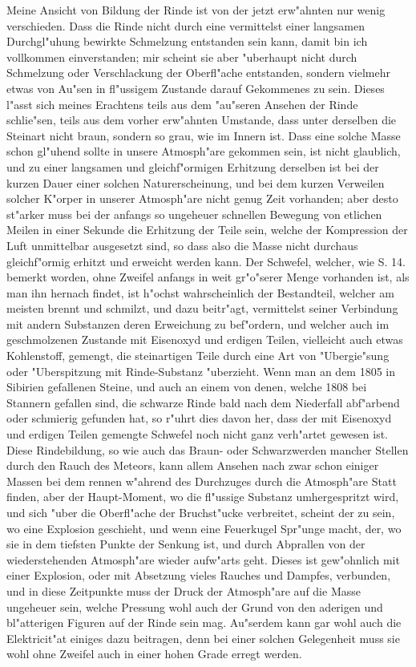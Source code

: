 \documentclass[a4paper, 11pt, oneside, polutonikogreek, german]{article}
\begin{document}
Meine Ansicht von Bildung der Rinde ist von der jetzt erw"ahnten nur wenig verschieden. Dass die Rinde nicht durch eine vermittelst einer langsamen Durchgl"uhung bewirkte Schmelzung entstanden sein kann, damit bin ich vollkommen einverstanden; mir scheint sie aber "uberhaupt nicht durch Schmelzung oder Verschlackung der Oberfl"ache entstanden, sondern vielmehr etwas von Au"sen in fl"ussigem Zustande darauf Gekommenes zu sein. Dieses l"asst sich meines Erachtens teils aus dem "au"seren Ansehen der Rinde schlie"sen, teils aus dem vorher erw"ahnten Umstande, dass unter derselben die Steinart nicht braun, sondern so grau, wie im Innern ist. Dass eine solche Masse schon gl"uhend sollte in unsere Atmosph"are gekommen sein, ist nicht glaublich, und zu einer langsamen und gleichf"ormigen Erhitzung derselben ist bei der kurzen Dauer einer solchen Naturerscheinung, und bei dem kurzen Verweilen solcher K"orper in unserer Atmosph"are nicht genug Zeit vorhanden; aber desto st"arker muss bei der anfangs so ungeheuer schnellen Bewegung von etlichen Meilen in einer Sekunde die Erhitzung der Teile sein, welche der Kompression der Luft unmittelbar ausgesetzt sind, so dass also die Masse nicht durchaus gleichf"ormig erhitzt und erweicht werden kann. Der Schwefel, welcher, wie S. 14. bemerkt worden, ohne Zweifel anfangs in weit gr"o"serer Menge vorhanden ist, als man ihn hernach findet, ist h"ochst wahrscheinlich der Bestandteil, welcher am meisten brennt und schmilzt, und dazu beitr"agt, vermittelst seiner Verbindung mit andern Substanzen deren Erweichung zu bef"ordern, und welcher auch im geschmolzenen Zustande mit Eisenoxyd und erdigen Teilen, vielleicht auch etwas Kohlenstoff, gemengt, die steinartigen Teile durch eine Art von "Ubergie"sung oder "Uberspitzung mit Rinde-Substanz "uberzieht. Wenn man an dem 1805 in Sibirien gefallenen Steine, und auch an einem von denen, welche 1808 bei Stannern gefallen sind, die schwarze Rinde bald nach dem Niederfall abf"arbend oder schmierig gefunden hat, so r"uhrt dies davon her, dass der mit Eisenoxyd und erdigen Teilen gemengte Schwefel noch nicht ganz verh"artet gewesen ist. Diese Rindebildung, so wie auch das Braun- oder Schwarzwerden mancher Stellen durch den Rauch des Meteors, kann allem Ansehen nach zwar schon einiger Massen bei dem rennen w"ahrend des Durchzuges durch die Atmosph"are Statt finden, aber der Haupt-Moment, wo die fl"ussige Substanz umhergespritzt wird, und sich "uber die Oberfl"ache der Bruchst"ucke verbreitet, scheint der zu sein, wo eine Explosion geschieht, und wenn eine Feuerkugel Spr"unge macht, der, wo sie in dem tiefsten Punkte der Senkung ist, und durch Abprallen von der wiederstehenden Atmosph"are wieder aufw"arts geht. Dieses ist gew"ohnlich mit einer Explosion, oder mit Absetzung vieles Rauches und Dampfes, verbunden, und in diese Zeitpunkte muss der Druck der Atmosph"are auf die Masse ungeheuer sein, welche Pressung wohl auch der Grund von den aderigen und bl"atterigen Figuren auf der Rinde sein mag. Au"serdem kann gar wohl auch die Elektricit"at einiges dazu beitragen, denn bei einer solchen Gelegenheit muss sie wohl ohne Zweifel auch in einer hohen Grade erregt werden.
\end{document}
